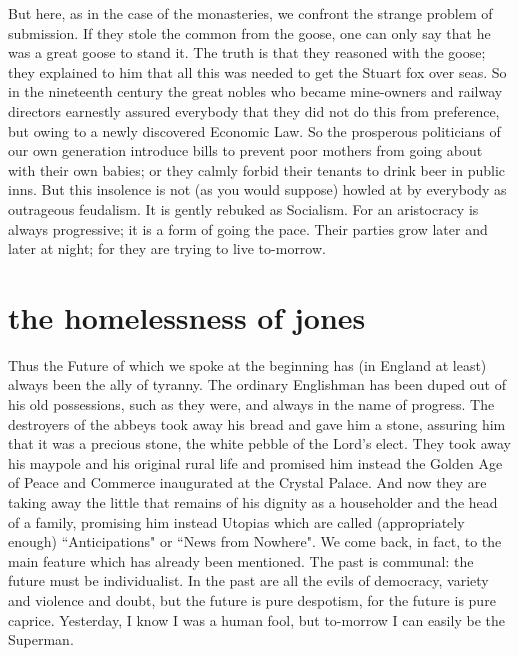 \documentclass[final,10pt,letterpaper,twocolumn,openany]{book}
\begin{document}
But here, as in the case of the monasteries, we confront the strange
problem of submission. If they stole the common from the goose, one can
only say that he was a great goose to stand it. The truth is that they
reasoned with the goose; they explained to him that all this was needed to
get the Stuart fox over seas. So in the nineteenth century the great nobles
who became mine-owners and railway directors earnestly assured
everybody that they did not do this from preference, but owing to a newly
discovered Economic Law. So the prosperous politicians of our own
generation introduce bills to prevent poor mothers from going about with
their own babies; or they calmly forbid their tenants to drink beer in public
inns. But this insolence is not (as you would suppose) howled at by
everybody as outrageous feudalism. It is gently rebuked as Socialism. For
an aristocracy is always progressive; it is a form of going the pace. Their
parties grow later and later at night; for they are trying to live to-morrow.

\section{the homelessness of jones}

    Thus the Future of which we spoke at the beginning has (in England at
least) always been the ally of tyranny. The ordinary Englishman has been
duped out of his old possessions, such as they were, and always in the
name of progress. The destroyers of the abbeys took away his bread and
gave him a stone, assuring him that it was a precious stone, the white
pebble of the Lord's elect. They took away his maypole and his original
rural life and promised him instead the Golden Age of Peace and
Commerce inaugurated at the Crystal Palace. And now they are taking
away the little that remains of his dignity as a householder and the head of
a family, promising him instead Utopias which are called (appropriately
enough) ``Anticipations" or ``News from Nowhere". We come back, in fact,
to the main feature which has already been mentioned. The past is
communal: the future must be individualist. In the past are all the evils of
democracy, variety and violence and doubt, but the future is pure
despotism, for the future is pure caprice. Yesterday, I know I was a human
fool, but to-morrow I can easily be the Superman.
\end{document}
